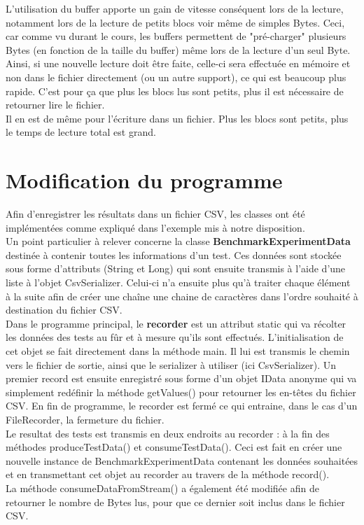 \documentclass[french]{article}
\begin{document}
			\noindent L'utilisation du buffer apporte un gain de vitesse conséquent lors de la lecture, notamment lors de la lecture de petits blocs voir même de simples Bytes. Ceci, car comme vu durant le cours, les buffers permettent de "pré-charger" plusieurs Bytes (en fonction de la taille du buffer) même lors de la lecture d'un seul Byte. Ainsi, si une nouvelle lecture doit être faite, celle-ci sera effectuée en mémoire et non dans le fichier directement (ou un autre support), ce qui est beaucoup plus rapide. C'est pour ça que plus les blocs lus sont petits, plus il est nécessaire de retourner lire le fichier. \\
			
			\noindent Il en est de même pour l'écriture dans un fichier. Plus les blocs sont petits, plus le temps de lecture total est grand.
				
	\section{Modification du programme}
		\noindent Afin d'enregistrer les résultats dans un fichier CSV, les classes ont été implémentées comme expliqué dans l'exemple mis à notre disposition. \\
		
		\noindent Un point particulier à relever concerne la classe \textbf{BenchmarkExperimentData} destinée à contenir toutes les informations d'un test. Ces données sont stockée sous forme d'attributs (String et Long) qui sont ensuite transmis à l'aide d'une liste à l'objet CsvSerializer. Celui-ci n'a ensuite plus qu'à traiter chaque élément à la suite afin de créer une chaîne une chaine de caractères dans l'ordre souhaité à destination du fichier CSV. \\
		
		\noindent Dans le programme principal, le \textbf{recorder} est un attribut static qui va récolter les données des tests au fûr et à mesure qu'ils sont effectués. L'initialisation de cet objet se fait directement dans la méthode main. Il lui est transmis le chemin vers le fichier de sortie, ainsi que le serializer à utiliser (ici CsvSerializer). Un premier record est ensuite enregistré sous forme d'un objet IData anonyme qui va simplement redéfinir la méthode getValues() pour retourner les en-têtes du fichier CSV. En fin de programme, le recorder est fermé ce qui entraine, dans le cas d'un FileRecorder, la fermeture du fichier. \\
		
		\noindent Le resultat des tests est transmis en deux endroits au recorder : à la fin des méthodes produceTestData() et consumeTestData(). Ceci est fait en créer une nouvelle instance de BenchmarkExperimentData contenant les données souhaitées et en transmettant cet objet au recorder au travers de la méthode record(). \\
		\noindent La méthode consumeDataFromStream() a également été modifiée afin de retourner le nombre de Bytes lus, pour que ce dernier soit inclus dans le fichier CSV.
	
\end{document}

